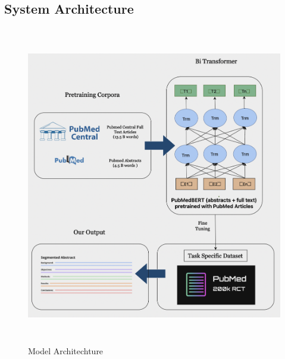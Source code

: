 \documentclass[12pt,a4paper]{report}     %
\begin{document}
\begin{normalsize}
{\section{System Architecture}
{\setlength{\baselineskip}{1.1\baselineskip}
\begin{figure}[h]
  \centering
  \includegraphics[width=16cm,height=14cm]{pubmed_architecture.png}
  \caption{Model Architechture}
  \label{fig:architectural}
\end{figure}

}}
\end{normalsize}
\end{document}
